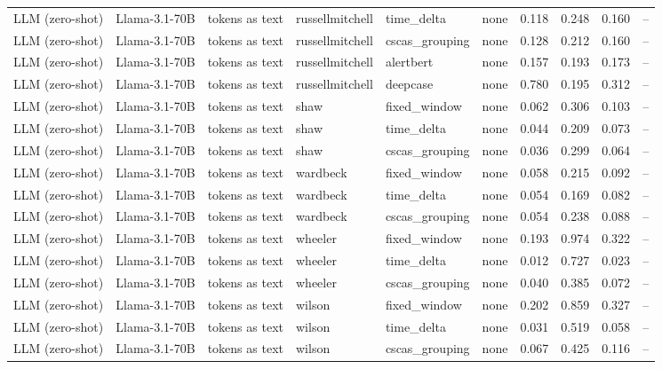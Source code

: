 \begin{longtable}{llllllcccc}
\addlinespace
LLM (zero-shot) & Llama-3.1-70B & tokens as text & russellmitchell & time\_delta & none & 0.118 & 0.248 & 0.160 & -- \\
\addlinespace
LLM (zero-shot) & Llama-3.1-70B & tokens as text & russellmitchell & cscas\_grouping & none & 0.128 & 0.212 & 0.160 & -- \\
\addlinespace
LLM (zero-shot) & Llama-3.1-70B & tokens as text & russellmitchell & alertbert & none & 0.157 & 0.193 & 0.173 & -- \\
\addlinespace
LLM (zero-shot) & Llama-3.1-70B & tokens as text & russellmitchell & deepcase & none & 0.780 & 0.195 & 0.312 & -- \\
\addlinespace
LLM (zero-shot) & Llama-3.1-70B & tokens as text & shaw & fixed\_window & none & 0.062 & 0.306 & 0.103 & -- \\
\addlinespace
LLM (zero-shot) & Llama-3.1-70B & tokens as text & shaw & time\_delta & none & 0.044 & 0.209 & 0.073 & -- \\
\addlinespace
LLM (zero-shot) & Llama-3.1-70B & tokens as text & shaw & cscas\_grouping & none & 0.036 & 0.299 & 0.064 & -- \\
\addlinespace
LLM (zero-shot) & Llama-3.1-70B & tokens as text & wardbeck & fixed\_window & none & 0.058 & 0.215 & 0.092 & -- \\
\addlinespace
LLM (zero-shot) & Llama-3.1-70B & tokens as text & wardbeck & time\_delta & none & 0.054 & 0.169 & 0.082 & -- \\
\addlinespace
LLM (zero-shot) & Llama-3.1-70B & tokens as text & wardbeck & cscas\_grouping & none & 0.054 & 0.238 & 0.088 & -- \\
\addlinespace
LLM (zero-shot) & Llama-3.1-70B & tokens as text & wheeler & fixed\_window & none & 0.193 & 0.974 & 0.322 & -- \\
\addlinespace
LLM (zero-shot) & Llama-3.1-70B & tokens as text & wheeler & time\_delta & none & 0.012 & 0.727 & 0.023 & -- \\
\addlinespace
LLM (zero-shot) & Llama-3.1-70B & tokens as text & wheeler & cscas\_grouping & none & 0.040 & 0.385 & 0.072 & -- \\
\addlinespace
LLM (zero-shot) & Llama-3.1-70B & tokens as text & wilson & fixed\_window & none & 0.202 & 0.859 & 0.327 & -- \\
\addlinespace
LLM (zero-shot) & Llama-3.1-70B & tokens as text & wilson & time\_delta & none & 0.031 & 0.519 & 0.058 & -- \\
\addlinespace
LLM (zero-shot) & Llama-3.1-70B & tokens as text & wilson & cscas\_grouping & none & 0.067 & 0.425 & 0.116 & -- \\

\end{longtable}
